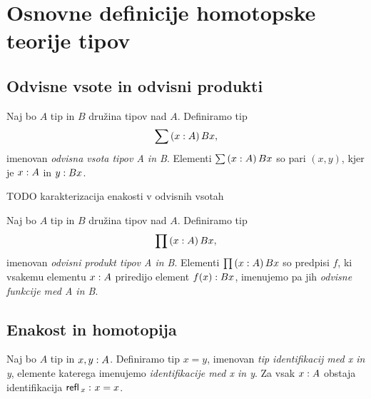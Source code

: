 \section{Osnovne definicije homotopske teorije tipov}

\subsection{Odvisne vsote in odvisni produkti}

\begin{definicija}
  Naj bo \(A\) tip in \(B\) družina tipov nad \(A\).
  Definiramo tip \[\sum \left( x : A \right) Bx,\]
  imenovan \emph{odvisna vsota tipov A in B}. Elementi \(\sum \left( x : A \right) Bx\) so pari
  \(\left(x, y\right)\), kjer je \(x : A\) in \(y : Bx\).
\end{definicija}

\begin{trditev}
  \label{eq-Sigma}
  TODO karakterizacija enakosti v odvisnih vsotah
\end{trditev}

\begin{definicija}
  Naj bo \(A\) tip in \(B\) družina tipov nad \(A\).
  Definiramo tip \[\prod \left( x : A \right) Bx,\]
  imenovan \emph{odvisni produkt tipov A in B}. Elementi
  \(\prod \left( x : A \right) Bx\) so predpisi \(f\), ki vsakemu elementu \(x : A\)
  priredijo element \(f(x) : Bx\), imenujemo pa jih
  \emph{odvisne funkcije med A in B}.
\end{definicija}

\subsection{Enakost in homotopija}

\begin{definicija}
  Naj bo \(A\) tip in \(x, y : A\). Definiramo tip \(x = y\), imenovan
  \emph{tip identifikacij med x in y}, elemente katerega imenujemo
  \emph{identifikacije med x in y}. Za vsak \(x : A\) obstaja identifikacija
  \(\textnormal{\textsf{refl}}\,_{x} \,\colon x = x\).
\end{definicija}

